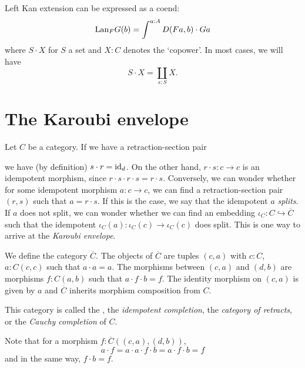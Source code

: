 \begin{remark}
  Left Kan extension can be expressed as a coend:
  \[ \text{Lan}_{F}G(b) = \int^{a : A} D(F a, b) \cdot G a \]
  where $ S \cdot X $ for $ S $ a set and $ X : C $ denotes the `copower'. In most cases, we will have
  \[ S \cdot X = \coprod_{s : S} X. \]
\end{remark}

\section{The Karoubi envelope}
Let $ C $ be a category. If we have a retraction-section pair
we have (by definition) $ s \cdot r = \text{id}_{d} $. On the other hand, $ r \cdot s: c \to c $ is an idempotent morphism, since $ r \cdot s \cdot r \cdot s = r \cdot s $. Conversely, we can wonder whether for some idempotent morphism $ a: c \to c $, we can find a retraction-section pair $ (r, s) $ such that $ a = r \cdot s $. If this is the case, we say that the idempotent $ a $ \textit{splits}. If $ a $ does not split, we can wonder whether we can find an embedding $ \iota_C : C \hookrightarrow \overline C $ such that the idempotent $ \iota_C(a): \iota_C(c) \to \iota_C(c) $ does split. This is one way to arrive at the \textit{Karoubi envelope}.

\begin{definition}
  We define the category $ \overline C $. The objects of $ \overline C $ are tuples $ (c, a) $ with $ c: C $, $ a: C(c, c) $ such that $ a \cdot a = a $. The morphisms between $ (c, a) $ and $ (d, b) $ are morphisms $ f: C(a, b) $ such that $ a \cdot f \cdot b = f $. The identity morphism on $ (c, a) $ is given by $ a $ and $ \overline C $ inherits morphism composition from $ C $.
\end{definition}
This category is called the , the \textit{idempotent completion}, the \textit{category of retracts}, or the \textit{Cauchy completion} of $ C $.

\begin{remark}
  Note that for a morphism $ f: \overline C((c, a), (d, b)) $,
  \[ a \cdot f = a \cdot a \cdot f \cdot b = a \cdot f \cdot b = f \]
  and in the same way, $ f \cdot b = f $.
\end{remark}

